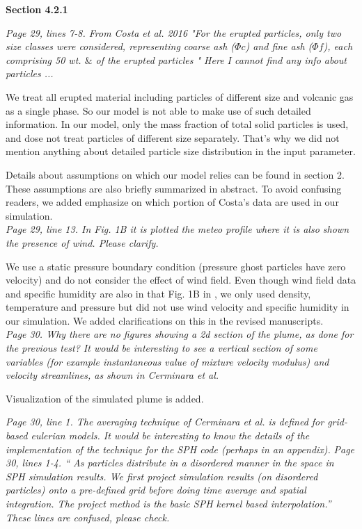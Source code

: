 \documentclass[10pt,a4paper]{article}
\begin{document}
\textbf{Section 4.2.1}

\textit{ Page 29, lines 7-8. From Costa et al. 2016 "For the erupted particles, only two size classes were considered, representing coarse ash ($\Phi c$) and fine ash ($\Phi f$), each comprising 50 wt. $\&$ of the erupted particles " Here I cannot find any info about particles ...}

We treat all erupted material including particles of different size and volcanic gas as a single phase. So our model is not able to make use of such detailed information. In our model, only the mass fraction of total solid particles is used, and dose not treat particles of different size separately. That's why we did not mention anything about detailed particle size distribution in the input parameter.
 
Details about assumptions on which our model relies can be found in section 2. These assumptions are also briefly summarized in abstract. To avoid confusing readers, we added emphasize on which portion of Costa’s data are used in our simulation. \\[3pt]

\textit{Page 29, line 13. In Fig. 1B it is plotted the meteo profile where it is also shown the presence of wind. Please clarify.}

We use a static pressure boundary condition (pressure ghost particles have zero velocity) and do not consider the effect of wind field. Even though wind field data and specific humidity are also in that Fig. 1B in \citet{costa2016results}, we only used density, temperature and pressure but did not use wind velocity and specific humidity in our simulation. 
We added clarifications on this in the revised manuscripts. \\[3pt]

\textit{Page 30. Why there are no figures showing a 2d section of the plume, as done for the previous test? It would be interesting to see a vertical section of some variables (for example instantaneous value of mixture velocity modulus) and velocity streamlines, as shown in Cerminara et al.}

Visualization of the simulated plume is added.

\textit{Page 30, line 1. The averaging technique of Cerminara et al. is defined for grid-based eulerian models. It would be interesting to know the details of the implementation of the technique for the SPH code (perhaps in an appendix).}
\textit{Page 30, lines 1-4. “ As particles distribute in a disordered manner in the space in SPH simulation results. We first project simulation results (on disordered particles) onto a pre-defined grid before doing time average and spatial integration. The project method is the basic SPH kernel based interpolation.” These lines are confused, please check.}
\end{document}
